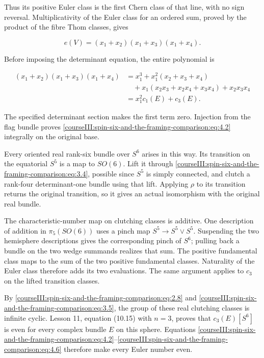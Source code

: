 Thus its positive Euler class is the first Chern class of that line, with no sign reversal. Multiplicativity of the Euler class for an ordered sum, proved by the product of the fibre Thom classes, gives

\begin{equation}
e(V)=(x_1+x_2)(x_1+x_3)(x_1+x_4).
\label{courseIII:spin-six-and-the-framing-comparison:eq:4.5}
\end{equation}

Before imposing the determinant equation, the entire polynomial is

\begin{equation}
\begin{aligned}
(x_1+x_2)(x_1+x_3)(x_1+x_4)
&=x_1^3+x_1^2(x_2+x_3+x_4)\\
&\quad+x_1(x_2x_3+x_2x_4+x_3x_4)+x_2x_3x_4\\
&=x_1^2c_1(E)+c_3(E).
\end{aligned}
\label{courseIII:spin-six-and-the-framing-comparison:eq:4.6}
\end{equation}

The specified determinant section makes the first term zero. Injection from the flag bundle proves \eqref{courseIII:spin-six-and-the-framing-comparison:eq:4.2} integrally on the original base.

Every oriented real rank-six bundle over \(S^6\) arises in this way. Its transition on the equatorial \(S^5\) is a map to \(SO(6)\). Lift it through \eqref{courseIII:spin-six-and-the-framing-comparison:eq:3.4}, possible since \(S^5\) is simply connected, and clutch a rank-four determinant-one bundle using that lift. Applying \(\rho\) to its transition returns the original transition, so it gives an actual isomorphism with the original real bundle.

The characteristic-number map on clutching classes is additive. One description of addition in \(\pi_5(SO(6))\) uses a pinch map \(S^5\to S^5\vee S^5\). Suspending the two hemisphere descriptions gives the corresponding pinch of \(S^6\); pulling back a bundle on the two wedge summands realizes that sum. The positive fundamental class maps to the sum of the two positive fundamental classes. Naturality of the Euler class therefore adds its two evaluations. The same argument applies to \(c_3\) on the lifted transition classes.

By \eqref{courseIII:spin-six-and-the-framing-comparison:eq:2.8} and \eqref{courseIII:spin-six-and-the-framing-comparison:eq:3.5}, the group of these real clutching classes is infinite cyclic. Lesson 11, equation (10.15) with \(n=3\), proves that \(c_3(E)[S^6]\) is even for every complex bundle \(E\) on this sphere. Equations \eqref{courseIII:spin-six-and-the-framing-comparison:eq:4.2}--\eqref{courseIII:spin-six-and-the-framing-comparison:eq:4.6} therefore make every Euler number even.

